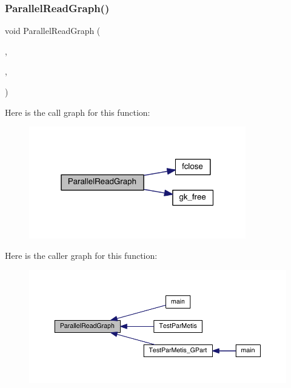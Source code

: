 \mbox{\label{a00954_a9229078a0340ad298a71750c0ad43353}} 
\subsubsection{\texorpdfstring{Parallel\+Read\+Graph()}{ParallelReadGraph()}}
{\footnotesize\ttfamily void Parallel\+Read\+Graph (\begin{DoxyParamCaption}\item[{\hyperlink{a00734}{graph\+\_\+t} $\ast$}]{,  }\item[{char $\ast$}]{,  }\item[{M\+P\+I\+\_\+\+Comm}]{ }\end{DoxyParamCaption})}

Here is the call graph for this function\+:\nopagebreak
\begin{figure}[H]
\begin{center}
\leavevmode
\includegraphics[width=268pt]{a00954_a9229078a0340ad298a71750c0ad43353_cgraph}
\end{center}
\end{figure}
Here is the caller graph for this function\+:\nopagebreak
\begin{figure}[H]
\begin{center}
\leavevmode
\includegraphics[width=350pt]{a00954_a9229078a0340ad298a71750c0ad43353_icgraph}
\end{center}
\end{figure}
\mbox{\label{a00954_ad1d29ead9f4773175b1f6bbdccf4b44c}} 
